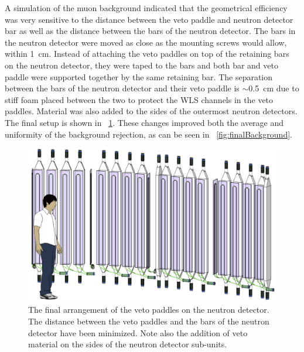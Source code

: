 A simulation of the muon background indicated that the geometrical efficiency was very sensitive to the distance between the veto paddle and neutron detector bar as well as the distance between the bars of the neutron detector.   The bars in the neutron detector were moved as close as the mounting screws would allow, within 1~cm.  Instead of attaching the veto paddles on top of the retaining bars on the neutron detector, they were taped to the bars and both bar and veto paddle were supported together by the same retaining bar.  The separation between the bars of the neutron detector and their veto paddle is $\sim$0.5~cm due to stiff foam placed between the two to protect the WLS channels in the veto paddles.  Material was also added to the sides of the outermost neutron detectors.  The final setup is shown in {\fig}~\ref{fig:vetoSetup}.  These changes improved both the average and uniformity of the background rejection, as can be seen in {\fig}~\ref{fig:finalBackground}.
\begin{figure}[!htbp]
\centering
\includegraphics[width=1.0\textwidth]{figures/neutwall_Oct18.eps}
\caption{The final arrangement of the veto paddles on the neutron detector.  The distance between the veto paddles and the bars of the neutron detector have been minimized.  Note also the addition of veto material on the sides of the neutron detector sub-units.}
\label{fig:vetoSetup}
\end{figure}

